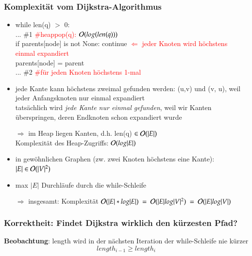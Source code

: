         \subsubsection*{Komplexität vom Dijkstra-Algorithmus}
        \begin{itemize}
        \item while len(q) $>$ 0: \\
        ... \#1 \hspace*{6cm} \textcolor{red}{\#heappop(q): $\mathcal{O}{}(log(len(q)))$}\\
        if parents[node] is not None: continue \textcolor{red}{$\Leftarrow$ jeder Knoten wird höchstens einmal expandiert}\\
        parents[node] = parent \\
        ... \#2\hspace*{6cm}  \textcolor{red}{\#für jeden Knoten höchstens 1-mal}
        \item jede Kante kann höchstens zweimal gefunden werden: (u,v) und (v, u), weil jeder Anfangsknoten nur einmal expandiert \\
        tatsächlich wird \emph{jede Kante nur einmal gefunden}, weil wir Kanten überspringen, deren Endknoten schon expandiert wurde
        \item[$\Rightarrow$] im Heap liegen Kanten, d.h. len(q) $\in \mathcal{O}{}(|E|)$ \\
        Komplexität des Heap-Zugriffs: \hspace*{0.5cm} $\mathcal{O}{}(log|E|)$
        \item in gewöhnlichen Graphen (zw. zwei Knoten höchstens eine Kante): \hspace*{0.5cm} $|E| \in \mathcal{O}{}(|V|^2)$
        \item max $|E|$ Durchläufe durch die while-Schleife
        \item[$\Rightarrow$] insgesamt: Komplexität \hspace*{0.5cm} $\mathcal{O}{}(|E| * log|E|) \ =\  \mathcal{O}{}(|E| log |V|^2) \ =\  \mathcal{O}{}(|E| log |V|)$
        \end{itemize}

        \subsubsection*{Korrektheit: Findet Dijkstra wirklich den kürzesten Pfad?}

        \textbf{Beobachtung}: length wird in der nächsten Iteration der while-Schleife nie kürzer
        \[ length_{i-1} \geq length_i\]

